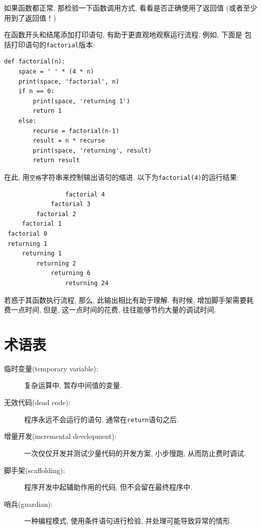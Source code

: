 \documentclass[10pt]{book}
\begin{document}
如果函数都正常, 那检验一下函数调用方式, 看看是否正确使用了返回值
(或者至少用到了返回值！)

在函数开头和结尾添加打印语句, 有助于更直观地观察运行流程. 例如, 下面是
包括打印语句的{\tt factorial}版本:

\begin{verbatim}
def factorial(n):
    space = ' ' * (4 * n)
    print(space, 'factorial', n)
    if n == 0:
        print(space, 'returning 1')
        return 1
    else:
        recurse = factorial(n-1)
        result = n * recurse
        print(space, 'returning', result)
        return result
\end{verbatim}
%
在此, 用{\tt 空格}字符串来控制输出语句的缩进. 以下为{\tt factorial(4)}的运行结果:

\begin{verbatim}
                 factorial 4
             factorial 3
         factorial 2
     factorial 1
 factorial 0
 returning 1
     returning 1
         returning 2
             returning 6
                 returning 24
\end{verbatim}
%
若惑于其函数执行流程, 那么, 此输出相比有助于理解. 
有时候, 增加脚手架需要耗费一点时间, 
但是, 这一点时间的花费, 往往能够节约大量的调试时间. 

\section{术语表}

\begin{description}

\item[临时变量(temporary variable):] 复杂运算中, 暂存中间值的变量. 

\item[无效代码(dead code):]  程序永远不会运行的语句, 通常在{\tt return}语句之后. 

\item[增量开发(incremental development):]  一次仅仅开发并测试少量代码的开发方案, 
小步慢跑, 从而防止费时调试. 

\item[脚手架(scaffolding):]  程序开发中起辅助作用的代码, 但不会留在最终程序中. 

\item[哨兵(guardian):]  一种编程模式, 使用条件语句进行检验, 并处理可能导致异常的情形. 

\end{description}
\end{document}
